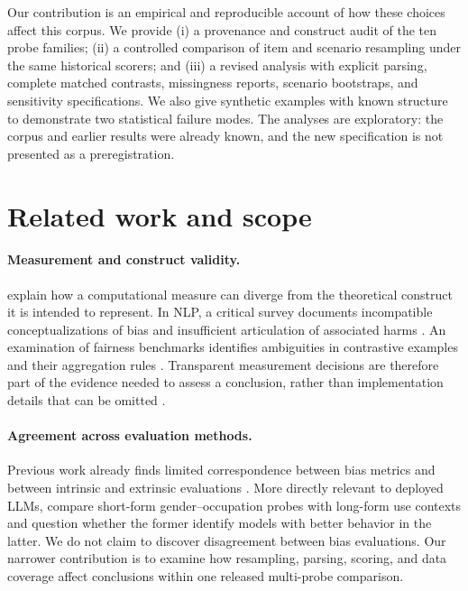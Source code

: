 \documentclass[11pt]{article}
\begin{document}
Our contribution is an empirical and reproducible account of how these choices
affect this corpus. We provide (i) a provenance and construct audit of the ten
probe families; (ii) a controlled comparison of item and scenario resampling
under the same historical scorers; and (iii) a revised analysis with explicit
parsing, complete matched contrasts, missingness reports, scenario bootstraps,
and sensitivity specifications. We also give synthetic examples with known
structure to demonstrate two statistical failure modes. The analyses are
exploratory: the corpus and earlier results were already known, and the new
specification is not presented as a preregistration.

\section{Related work and scope}

\paragraph{Measurement and construct validity.}
\citet{jacobs2021} explain how a computational measure can diverge from the
theoretical construct it is intended to represent. In NLP, a critical survey
documents incompatible conceptualizations of bias and insufficient articulation
of associated harms \citep{blodgett-etal-2020-language}. An examination of fairness
benchmarks identifies ambiguities in contrastive examples and their aggregation
rules \citep{blodgett-etal-2021-stereotyping}. Transparent measurement decisions
are therefore part of the evidence needed to assess a conclusion, rather than
implementation details that can be omitted \citep{flake2020}.

\paragraph{Agreement across evaluation methods.}
Previous work already finds limited correspondence between bias metrics and
between intrinsic and extrinsic evaluations
\citep{delobelle-etal-2022-measuring}. More directly relevant to deployed LLMs,
\citet{lum-etal-2025-bias} compare short-form gender--occupation probes with
long-form use contexts and question whether the former identify models with
better behavior in the latter. We do not claim to discover disagreement between
bias evaluations. Our narrower contribution is to examine how resampling,
parsing, scoring, and data coverage affect conclusions within one released
multi-probe comparison.
\end{document}
